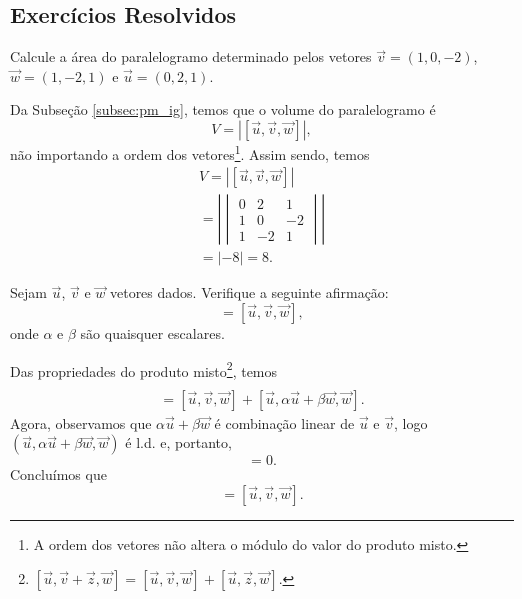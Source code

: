 \subsection{Exercícios Resolvidos}

\begin{exeresol}
  Calcule a área do paralelogramo determinado pelos vetores $\vec{v}=(1,0,-2)$, $\vec{w}=(1,-2,1)$ e $\vec{u}=(0,2,1)$.
\end{exeresol}
\begin{resol}
  Da Subseção \ref{subsec:pm_ig}, temos que o volume do paralelogramo é
  \begin{equation}
    V = |[\vec{u},\vec{v},\vec{w}]|,
  \end{equation}
  não importando a ordem dos vetores\footnote{A ordem dos vetores não altera o módulo do valor do produto misto.}. Assim sendo, temos
  \begin{gather}
    V = |[\vec{u},\vec{v},\vec{w}]| \\
    = \left|
      \begin{vmatrix}
        0 & 2 & 1 \\
        1 & 0 & -2 \\
        1 & -2 & 1 
      \end{vmatrix}
    \right| \\
    = |-8| = 8.
  \end{gather}
\end{resol}

\begin{exeresol}
  Sejam $\vec{u}$, $\vec{v}$ e $\vec{w}$ vetores dados. Verifique a seguinte afirmação:
  \begin{equation}
    [\vec{u},\vec{v}+\alpha\vec{u}+\beta\vec{w},\vec{w}]=[\vec{u},\vec{v},\vec{w}],
  \end{equation}
  onde $\alpha$ e $\beta$ são quaisquer escalares.
\end{exeresol}
\begin{resol}
  Das propriedades do produto misto\footnote{$[\vec{u},\vec{v}+\vec{z},\vec{w}]=[\vec{u},\vec{v},\vec{w}]+[\vec{u},\vec{z},\vec{w}]$.}, temos
  \begin{gather}
    [\vec{u},\vec{v}+\alpha\vec{u}+\beta\vec{w},\vec{w}] \\
    = [\vec{u},\vec{v},\vec{w}] + [\vec{u},\alpha\vec{u}+\beta\vec{w},\vec{w}].
  \end{gather}
  Agora, observamos que $\alpha\vec{u}+\beta\vec{w}$ é combinação linear de $\vec{u}$ e $\vec{v}$, logo $(\vec{u}, \alpha\vec{u}+\beta\vec{w}, \vec{w})$ é l.d. e, portanto,
  \begin{equation}
    [\vec{u},\alpha\vec{u}+\beta\vec{w},\vec{w}] = 0.
  \end{equation}
  Concluímos que
  \begin{equation}
  [\vec{u},\vec{v}+\alpha\vec{u}+\beta\vec{w},\vec{w}]=[\vec{u},\vec{v},\vec{w}].  
  \end{equation}
\end{resol}


